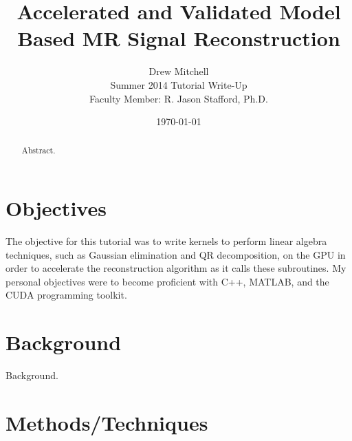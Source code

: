 \documentclass{article}
\begin{document}
\title{Accelerated and Validated Model Based MR Signal Reconstruction}
\author{Drew Mitchell\\
	Summer 2014 Tutorial Write-Up\\
	Faculty Member: R. Jason Stafford, Ph.D.}
\date{\today}
\maketitle

\begin{abstract}

Abstract.

\end{abstract}

\section*{Objectives}

The objective for this tutorial was to write kernels to perform linear algebra techniques, such as Gaussian elimination and QR decomposition, on the GPU in order to accelerate the reconstruction algorithm as it calls these subroutines. My personal objectives were to become proficient with C++, MATLAB, and the CUDA programming toolkit.

\section*{Background}

Background.

\section*{Methods/Techniques}
\end{document}
